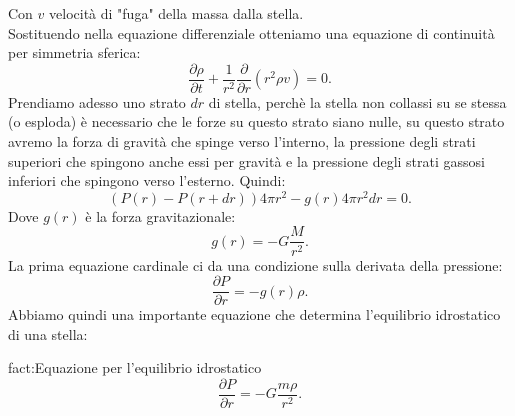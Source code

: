 Con $v$ velocità di "fuga" della massa dalla stella.\\
Sostituendo nella equazione differenziale otteniamo una equazione di continuità per simmetria sferica:
\[
	\frac{\partial \rho }{\partial t} +
	\frac{1}{r^2}\frac{\partial }{\partial r} (r^2 \rho  v) 
	=
	0
.\] 
Prendiamo adesso uno strato $dr$ di stella, perchè la stella non collassi su se stessa (o esploda) è necessario che le forze su questo strato siano nulle, su questo strato avremo la forza di gravità che spinge verso l'interno, la pressione degli strati superiori che spingono anche essi per gravità e la pressione degli strati gassosi inferiori che spingono verso l'esterno. Quindi:
\[
	\left( P(r) - P(r+dr) \right) 4\pi r^2 - g(r)4\pi r^2 dr = 0
.\] 
Dove $g(r)$ è la forza gravitazionale:
\[
	g(r) = -G \frac{M}{r^2}
.\] 
La prima equazione cardinale ci da una condizione sulla derivata della pressione:
\[
	\frac{\partial P}{\partial r} = -g(r)\rho
.\] 
Abbiamo quindi una importante equazione che determina l'equilibrio idrostatico di una stella:
\begin{fact}{fact:Equazione per l'equilibrio idrostatico}
	\[
		\frac{\partial P}{\partial r} =
		-G \frac{m\rho}{r^2}
	.\] 
\end{fact}
